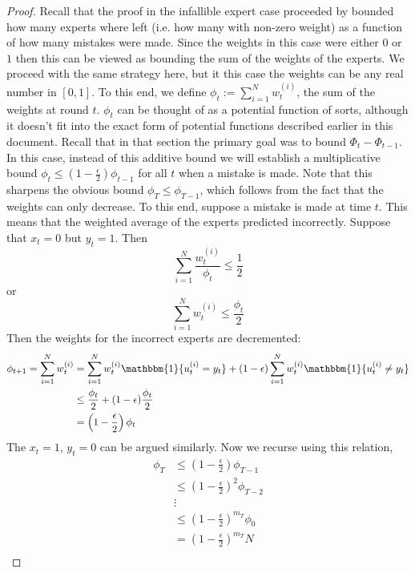 \documentclass[12pt]{article}
\begin{document}
\begin{proof}
Recall that the proof in the infallible expert case proceeded by bounded how many experts where left (i.e. how many with non-zero weight) as a function of how many mistakes were made.  Since the 
weights in this case were either $0$ or $1$ then this can be viewed as bounding the sum of the weights of the experts. We proceed with the same strategy here, but it this case the weights can be any 
real number in $[0, 1]$. To this end, we define $\phi_t := \sum_{i = 1}^{N} w_t^{(i)}$, the sum of the weights at round $t$. $\phi_t$ can be thought of as a potential function of sorts, although it doesn't 
fit into the exact form of potential functions described earlier in this document. Recall that in that section the primary goal was to bound $\Phi_{t} - \Phi_{t - 1}$. In this case, instead of this additive bound 
we will establish a multiplicative bound $\phi_{t} \leq \left(1 - \frac{\epsilon}{2}\right)\phi_{t - 1}$ for all $t$ when a mistake is made. 
Note that this sharpens the obvious bound $\phi_T \leq \phi_{T - 1}$, which follows from the fact that the weights can only decrease. To this end, suppose a mistake is made at time $t$. This means that 
the weighted average of the experts predicted incorrectly. Suppose that $x_t = 0$ but $y_t = 1$. Then 
\[\sum_{i = 1}^{N} \frac{w_t^{(i)}}{\phi_t} \leq \frac{1}{2}\]
or 
\[\sum_{i = 1}^{N} w_t^{(i)} \leq \frac{\phi_t}{2}\]
Then the weights for the incorrect experts are decremented: 
\begin{align*}
\phi_{t + 1} = \sum_{i = 1}^{N} w_t^{(i)} &= \sum_{i = 1}^{N} w_t^{(i)}\mathbbm{1}\{u_t^{(i)} = y_t\} + (1 - \epsilon) \sum_{i = 1}^{N} w_t^{(i)}\mathbbm{1}\{u_t^{(i)} \neq y_t\} \\
							   &\leq \frac{\phi_t}{2} + (1 - \epsilon)\frac{\phi_t}{2} \\
							   &= \left(1 - \frac{\epsilon}{2}\right)\phi_t
\end{align*}
The $x_t = 1$, $y_t = 0$ can be argued similarly. Now we recurse using this relation, 
\begin{align*}
\phi_T &\leq \left(1 - \frac{\epsilon}{2}\right)\phi_{T - 1} \\
	  &\leq \left(1 - \frac{\epsilon}{2}\right)^2\phi_{T - 2} \\
	  &\vdots \\
	  &\leq \left(1 - \frac{\epsilon}{2}\right)^{m_T}\phi_{0} \\
	  &= \left(1 - \frac{\epsilon}{2}\right)^{m_T} N \\
\end{align*}

\end{proof}
\end{document}
